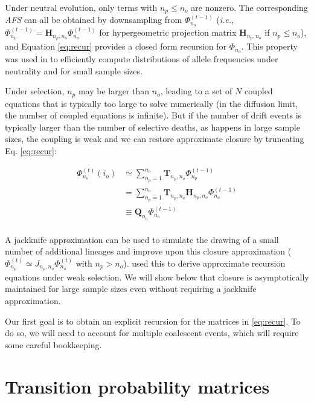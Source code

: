 \documentclass[review]{elsarticle}
\newcommand{\afs}[2]{\Phi_{#1}^{(#2)}}
\begin{document}
Under neutral evolution, only terms with $n_p\leq n_o$ are nonzero. The corresponding \textit{AFS}
can all be obtained by downsampling from $\afs{n_o}{t-1}$ (\textit{i.e.}, $\afs{n_p}{t-1} =
\mathbf{H}_{n_p,n_o} \afs{n_o}{t-1}$ for hypergeometric projection matrix $\mathbf{H}_{n_p,n_o}$ if
$n_p\leq n_o$), and Equation \eqref{eq:recur} provides a closed form recursion for $\Phi_{n_o}$.
This property was used in \cite{JouganousEtAl2017} to efficiently compute distributions of allele
frequencies under neutrality and for small sample sizes.

Under selection, $n_{p}$ may be larger than $n_o$, leading to a set of $N$ coupled equations that is
typically too large to solve numerically (in the diffusion limit, the number of coupled equations is
infinite). But if the number of drift events is typically larger than the number of selective
deaths, as happens in large sample sizes, the coupling is weak and we can restore approximate
closure by truncating Eq. \eqref{eq:recur}:

\begin{equation}
\begin{split}
  \afs{n_o}{t}(i_o)
  &\simeq \sum_{n_p=1}^{n_{o}} \mathbf{T}_{n_p,n_o}                      \afs{n_p}{t-1}\\
  &=      \sum_{n_p=1}^{n_{o}} \mathbf{T}_{n_p,n_o} \mathbf{H}_{n_p,n_o} \afs{n_o}{t-1}\\
  &\equiv \mathbf{Q}_{n_o}                                               \afs{n_o}{t-1}\\
\end{split}
\label{eq:truncated}
\end{equation}

A jackknife approximation \cite{Gravel2016} can be used to simulate the drawing of a small number of
additional lineages and improve upon this closure approximation
($\afs{n_p}{t} \simeq J_{n_p,n_o} \afs{n_o}{t}$ with $n_p>n_o$). \cite{JouganousEtAl2017} used this
to derive approximate recursion equations under weak selection. We will show below that closure is
asymptotically maintained for large sample sizes even without requiring a jackknife approximation.

Our first goal is to obtain an explicit recursion for the matrices in \eqref{eq:recur}. To do so, we
will need to account for multiple coalescent events, which will require some careful bookkeeping.

\section{Transition probability matrices}
\label{sec:trans-mat}
\end{document}
